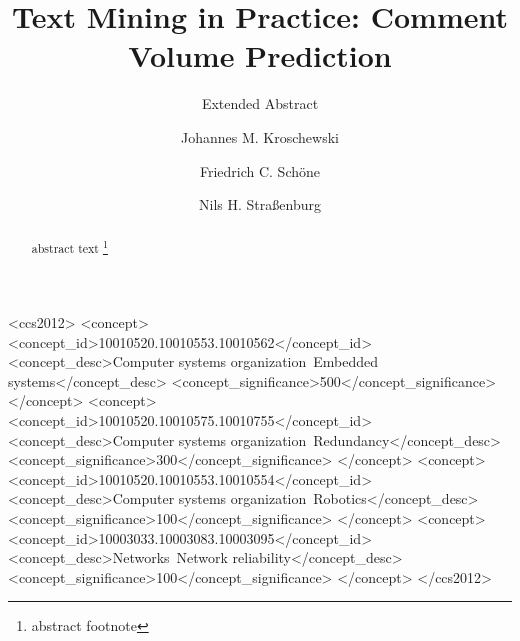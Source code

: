 \documentclass[10pt,sigconf]{acmart}
\begin{document}
\title{Text Mining in Practice: Comment Volume Prediction}
\subtitle{Extended Abstract} %

\author{Johannes M. Kroschewski}

\author{Friedrich C. Schöne}

\author{Nils H. Straßenburg}

\renewcommand{\shortauthors}{M. Kroschewski et al.}


\begin{abstract}
	abstract text \footnote{abstract footnote}
\end{abstract}

\begin{CCSXML}
<ccs2012>
 <concept>
  <concept_id>10010520.10010553.10010562</concept_id>
  <concept_desc>Computer systems organization~Embedded systems</concept_desc>
  <concept_significance>500</concept_significance>
 </concept>
 <concept>
  <concept_id>10010520.10010575.10010755</concept_id>
  <concept_desc>Computer systems organization~Redundancy</concept_desc>
  <concept_significance>300</concept_significance>
 </concept>
 <concept>
  <concept_id>10010520.10010553.10010554</concept_id>
  <concept_desc>Computer systems organization~Robotics</concept_desc>
  <concept_significance>100</concept_significance>
 </concept>
 <concept>
  <concept_id>10003033.10003083.10003095</concept_id>
  <concept_desc>Networks~Network reliability</concept_desc>
  <concept_significance>100</concept_significance>
 </concept>
</ccs2012>  
\end{CCSXML}

\end{document}
